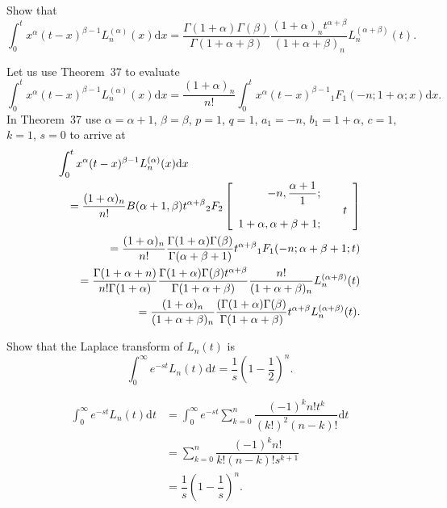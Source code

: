 \begin{problem}\label{problem9chapter12}
Show that
$$\displaystyle\int_0^t x^{\alpha} (t-x)^{\beta - 1} L_n^{(\alpha)}(x) \mathrm{d}x = \dfrac{\Gamma(1 + \alpha) \Gamma(\beta)}{\Gamma(1 + \alpha + \beta)} \dfrac{(1 + \alpha)_n t^{\alpha + \beta}}{(1 + \alpha+ \beta)_n} L_n^{(\alpha + \beta)}(t).$$
\end{problem}
\begin{solution}
Let us use Theorem~37 to evaluate
$$\displaystyle\int_0^t x^{\alpha} (t-x)^{\beta - 1} L_n^{(\alpha)}(x) \mathrm{d}x = \dfrac{(1+\alpha)_n}{n!} \displaystyle\int_0^t x^{\alpha} (t-x)^{\beta - 1} {}_1F_1(-n; 1+\alpha;x)\mathrm{d}x.$$
In Theorem~37 use $\alpha=\alpha+1$, $\beta=\beta$, $p=1$, $q=1$, $a_1=-n$, $b_1=1+\alpha$, $c=1$, $k=1$, $s=0$ to arrive at
\begin{eqnarray*}
\lefteqn{\displaystyle\int_0^t x^{\alpha} (t-x)^{\beta - 1} L_n^{(\alpha)}(x) \mathrm{d}x} \\
& &= \dfrac{(1+\alpha)_n}{n!} B(\alpha+1,\beta) t^{\alpha+\beta} {}_2F_2 \left[ \begin{array}{rlr}
-n, \dfrac{\alpha+1}{1}; & & \\
& & t \\
1+\alpha, \alpha+\beta+1; & &
\end{array} \right] \\
& &= \dfrac{(1+\alpha)_n}{n!} \dfrac{\Gamma(1+\alpha) \Gamma(\beta)}{\Gamma(\alpha+\beta+1)} t^{\alpha+\beta} {}_1F_1(-n; \alpha+\beta+1; t) \\
& &= \dfrac{\Gamma(1+\alpha+n)}{n! \Gamma(1+\alpha)} \dfrac{\Gamma(1+\alpha) \Gamma(\beta) t^{\alpha+\beta}}{\Gamma(1+\alpha+\beta)} \dfrac{n!}{(1+\alpha+\beta)_n} L_n^{(\alpha+\beta)}(t) \\
& &= \dfrac{(1+\alpha)_n}{(1+\alpha+\beta)_n} \dfrac{(\Gamma(1+\alpha)\Gamma(\beta)}{\Gamma(1+\alpha+\beta)} t^{\alpha+\beta} L_n^{(\alpha+\beta)}(t).
\end{eqnarray*}
\end{solution}
\begin{problem}\label{problem10chapter12}
Show that the Laplace transform of $L_n(t)$ is 
$$\displaystyle\int_0^{\infty} e^{-st} L_n(t) \mathrm{d}t = \dfrac{1}{s} \left( 1 - \dfrac{1}{2} \right)^n.$$
\end{problem}
\begin{solution}
$$\begin{array}{ll}
\displaystyle\int_0^{\infty} e^{-st} L_n(t) \mathrm{d}t &= \displaystyle\int_0^{\infty} e^{-st} \displaystyle\sum_{k=0}^n \dfrac{(-1)^k n! t^k }{(k!)^2 (n-k)!} \mathrm{d}t \\
&= \displaystyle\sum_{k=0}^n \dfrac{(-1)^k n!}{k! (n-k)! s^{k+1}} \\
&= \dfrac{1}{s} \left( 1 - \dfrac{1}{s} \right)^n.
\end{array}$$
\end{solution}
